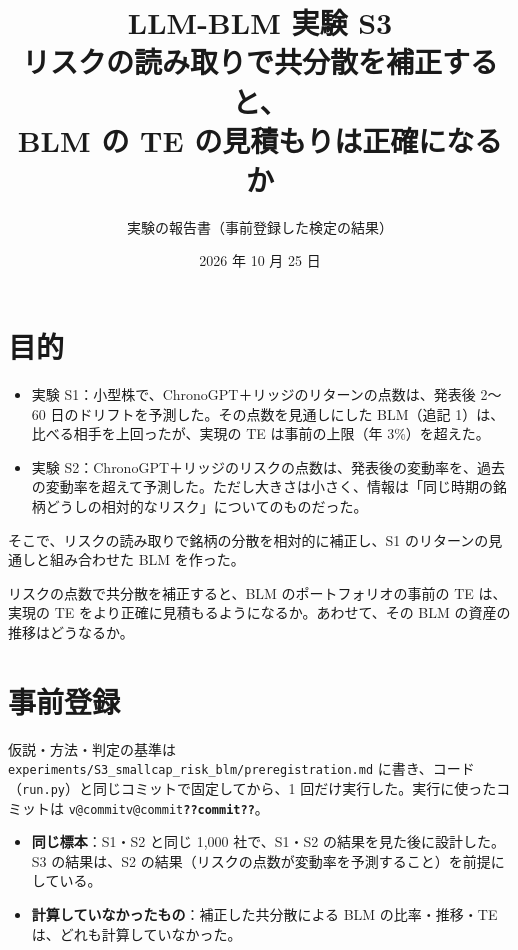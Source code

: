 \documentclass[xelatex,ja=standard,jafont=haranoaji,a4paper,10pt,openany]{bxjsreport}
\title{LLM-BLM 実験 S3\\[6pt]
  \large リスクの読み取りで共分散を補正すると、\\BLM の TE の見積もりは正確になるか}
\author{実験の報告書（事前登録した検定の結果）}
\date{2026 年 10 月 25 日}
\makeatletter
\newcommand{\V}[1]{\ifcsname v@#1\endcsname\csname v@#1\endcsname\else\textbf{??#1??}\fi}
\newcommand{\code}[1]{\texttt{#1}}
\makeatother
\begin{document}
\maketitle



\setcounter{tocdepth}{1}
{\small\tableofcontents}

\chapter{目的}\label{ch:purpose}

\begin{itemize}
\item 実験 S1：小型株で、ChronoGPT＋リッジのリターンの点数は、発表後 2〜60 日のドリフトを予測した。その点数を見通しにした BLM（追記 1）は、比べる相手を上回ったが、実現の TE は事前の上限（年 3\%）を超えた。
\item 実験 S2：ChronoGPT＋リッジのリスクの点数は、発表後の変動率を、過去の変動率を超えて予測した。ただし大きさは小さく、情報は「同じ時期の銘柄どうしの相対的なリスク」についてのものだった。
\end{itemize}

そこで、リスクの読み取りで銘柄の分散を相対的に補正し、S1 のリターンの見通しと組み合わせた BLM を作った。

\begin{keybox}[問い]
リスクの点数で共分散を補正すると、BLM のポートフォリオの事前の TE は、実現の TE をより正確に見積もるようになるか。あわせて、その BLM の資産の推移はどうなるか。
\end{keybox}

\chapter{事前登録}\label{ch:prereg}

仮説・方法・判定の基準は \code{experiments/S3\_smallcap\_risk\_blm/preregistration.md} に書き、コード（\code{run.py}）と同じコミットで固定してから、1 回だけ実行した。実行に使ったコミットは \code{\V{commit}}。

\begin{itemize}
\item \textbf{同じ標本}：S1・S2 と同じ 1,000 社で、S1・S2 の結果を見た後に設計した。S3 の結果は、S2 の結果（リスクの点数が変動率を予測すること）を前提にしている。
\item \textbf{計算していなかったもの}：補正した共分散による BLM の比率・推移・TE は、どれも計算していなかった。
\end{itemize}
\end{document}

